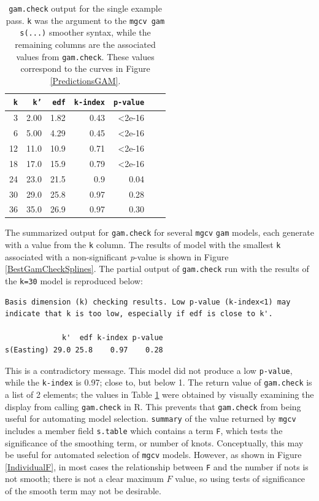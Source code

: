 \documentclass[phdcss]{SDSUThesis}
\begin{document}
\begin{table}[ht]
\centering
\begin{tabular}{r r r r r r r} 
 \hline
 \texttt{k} & \texttt{k'} & \texttt{edf} & \texttt{k-index} & \texttt{p-value} \\ 
 \hline
 3 & 2.00 & 1.82 & 0.43 & <2e-16 \\
 6 & 5.00 & 4.29 & 0.45 & <2e-16 \\
12 & 11.0 & 10.9 & 0.71 & <2e-16 \\
18 & 17.0 & 15.9 & 0.79 & <2e-16 \\
24 & 23.0 & 21.5 & 0.9 & 0.04 \\
30 & 29.0 & 25.8 & 0.97 & 0.28 \\
36 & 35.0 & 26.9 & 0.97 & 0.30 \\
\end{tabular}
\caption{\texttt{gam.check} output for the single example pass. \texttt{k} was the argument to the \texttt{mgcv gam} \texttt{s(...)} smoother syntax, while the remaining columns are the associated values from \texttt{gam.check}. These values correspond to the curves in Figure \ref{PredictionsGAM}.}
\label{gam.check.tbl}
\end{table}

The summarized output for \texttt{gam.check} for several \texttt{mgcv} \texttt{gam} models, each generate with a value from the \texttt{k} column. The results of model with the smallest \texttt{k} associated with a non-significant \textit{p}-value is shown in Figure \ref{BestGamCheckSplines}. The partial output of \texttt{gam.check} run with the results of the \texttt{k=30} model is reproduced below:
\begin{verbatim}
Basis dimension (k) checking results. Low p-value (k-index<1) may
indicate that k is too low, especially if edf is close to k'.

             k'  edf k-index p-value
s(Easting) 29.0 25.8    0.97    0.28
\end{verbatim}

This is a contradictory message. This model did not produce a low \texttt{p-value}, while the \texttt{k-index} is 0.97; close to, but below 1. The return value of \texttt{gam.check} is a list of 2 elements; the values in Table \ref{gam.check.tbl} were obtained by visually examining the display from calling \texttt{gam.check} in R. This prevents that \texttt{gam.check} from being useful for automating model selection. \texttt{summary} of the value returned by \texttt{mgcv} includes a member field \texttt{s.table} which contains a term \texttt{F}, which tests the significance of the smoothing term, or number of knots. Conceptually, this may be useful for automated selection of \texttt{mgcv} models. However, as shown in Figure \ref{IndividualF}, in most cases the relationship between \texttt{F} and the number if nots is not smooth; there is not a clear maximum $F$ value, so using tests of significance of the smooth term may not be desirable.
\end{document}
